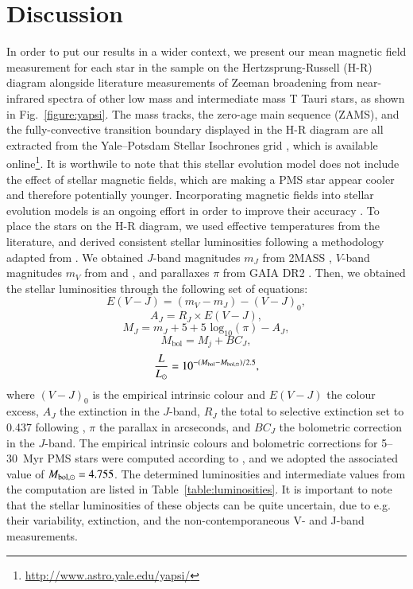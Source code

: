 \documentclass{aa}
\begin{document}
\section{Discussion}
\label{section:discussion}
In order to put our results in a wider context, we present our mean magnetic field measurement for each star in the sample on the Hertzsprung-Russell (H-R) diagram alongside literature measurements of Zeeman broadening from near-infrared spectra of other low mass and intermediate mass T Tauri stars, as shown in Fig.~\ref{figure:yapsi}. The mass tracks, the zero-age main sequence (ZAMS), and the fully-convective transition boundary displayed in the H-R diagram are all extracted from the Yale–Potsdam Stellar Isochrones grid \citep{2017ApJ...838..161S}, which is available online\footnote{\url{http://www.astro.yale.edu/yapsi/}}. It is worthwile to note that this stellar evolution model does not include the effect of stellar magnetic fields, which are making a PMS star appear cooler and therefore potentially younger. Incorporating magnetic fields into stellar evolution models is an ongoing effort in order to improve their accuracy \citep[e.g. ][]{2016A&A...593A..99F}. To place the stars on the H-R diagram, we used effective temperatures from the literature, and derived consistent stellar luminosities following a methodology adapted from \citet{2019villebrun}. We obtained $J$-band magnitudes $m_J$ from 2MASS \citep{2003tmc..book.....C}, $V$-band magnitudes $m_V$ from \citet{1992A&AS...92..481B} and \citet[and references therein]{2006A&A...460..695T}, and parallaxes $\pi$ from GAIA DR2 \citep{2016A&A...595A...1G,2018A&A...616A...1G}. Then, we obtained the stellar luminosities through the following set of equations:
$$ E(V-J) = (m_V - m_J) - (V-J)_0, $$
$$ A_J =  R_J \times E(V-J), $$
$$ M_J = m_J + 5 + 5 \text{ log}_{10}(\pi) - A_J, $$ 
$$ M_\text{bol} = M_j + BC_J, $$
$$ \frac{L}{L_{\odot}} = 10^{-(M_{\text{bol}} - M_{\text{bol,\ensuremath{\odot}}})/2.5}, $$
where $(V-J)_0$ is the empirical intrinsic colour and $E(V-J)$ the colour excess, $A_J$ the extinction in the $J$-band, $R_J$ the total to selective extinction set to 0.437 following \citet{2019villebrun}, $\pi$ the parallax in arcseconds, and $BC_J$ the bolometric correction in the $J$-band. The empirical intrinsic colours and bolometric corrections for 5--30~Myr PMS stars were computed according to \citet{2013ApJS..208....9P}, and we adopted the associated value of $M_{\text{bol,\ensuremath{\odot}}} = 4.755$. The determined luminosities and intermediate values from the computation are listed in Table~\ref{table:luminosities}. It is important to note that the stellar luminosities of these objects can be quite uncertain, due to e.g. their variability, extinction, and the non-contemporaneous V- and J-band measurements.
\end{document}
